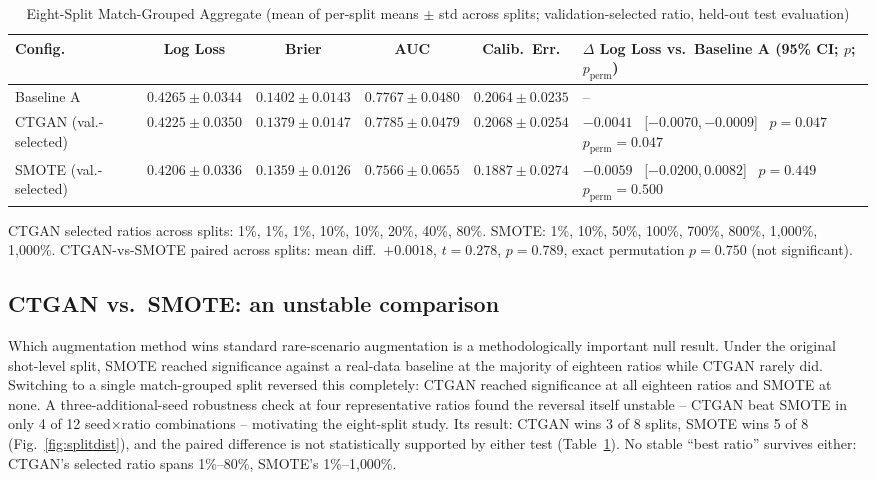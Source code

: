 \documentclass[conference,a4paper]{IEEEtran}
\begin{document}
\begin{table}[!t]
\centering
\caption{Eight-Split Match-Grouped Aggregate (mean of per-split means $\pm$ std across splits; validation-selected ratio, held-out test evaluation)}
\label{tab:aggregate}
\scriptsize
\begin{tabular}{lccccl}
\toprule
Config. & Log Loss & Brier & AUC & Calib.\ Err. & $\Delta$ Log Loss vs.\ Baseline A (95\% CI; $p$; $p_{\text{perm}}$) \\
\midrule
Baseline A & $0.4265\pm0.0344$ & $0.1402\pm0.0143$ & $0.7767\pm0.0480$ & $0.2064\pm0.0235$ & -- \\
CTGAN (val.-selected) & $0.4225\pm0.0350$ & $0.1379\pm0.0147$ & $0.7785\pm0.0479$ & $0.2068\pm0.0254$ & $-0.0041$ \ [$-0.0070,-0.0009$] \ $p=0.047$ \ $p_{\text{perm}}=0.047$ \\
SMOTE (val.-selected) & $0.4206\pm0.0336$ & $0.1359\pm0.0126$ & $0.7566\pm0.0655$ & $0.1887\pm0.0274$ & $-0.0059$ \ [$-0.0200,0.0082$] \ $p=0.449$ \ $p_{\text{perm}}=0.500$ \\
\bottomrule
\end{tabular}

\vspace{2pt}
\raggedright\scriptsize CTGAN selected ratios across splits: 1\%, 1\%, 1\%, 10\%, 10\%, 20\%, 40\%, 80\%. SMOTE: 1\%, 10\%, 50\%, 100\%, 700\%, 800\%, 1{,}000\%, 1{,}000\%. CTGAN-vs-SMOTE paired across splits: mean diff.\ $+0.0018$, $t=0.278$, $p=0.789$, exact permutation $p=0.750$ (not significant).
\end{table}

\subsection{CTGAN vs.\ SMOTE: an unstable comparison}
\label{sec:instability}
Which augmentation method wins standard rare-scenario augmentation is a methodologically important null result. Under the original shot-level split, SMOTE reached significance against a real-data baseline at the majority of eighteen ratios while CTGAN rarely did. Switching to a single match-grouped split reversed this completely: CTGAN reached significance at all eighteen ratios and SMOTE at none. A three-additional-seed robustness check at four representative ratios found the reversal itself unstable -- CTGAN beat SMOTE in only 4 of 12 seed$\times$ratio combinations -- motivating the eight-split study. Its result: CTGAN wins 3 of 8 splits, SMOTE wins 5 of 8 (Fig.~\ref{fig:splitdist}), and the paired difference is not statistically supported by either test (Table~\ref{tab:aggregate}). No stable ``best ratio'' survives either: CTGAN's selected ratio spans 1\%--80\%, SMOTE's 1\%--1{,}000\%.
\end{document}
